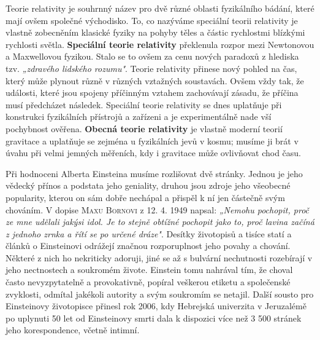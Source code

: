        Teorie relativity je souhrnný název pro dvě různé oblasti fyzikálního bádání, které mají
        ovšem společné východisko. To, co nazýváme speciální teorii relativity je vlastně zobecněním
        klasické fyziky na pohyby těles a částic rychlostmi blízkými rychlosti světla.
        \textbf{Speciální teorie relativity} překlenula rozpor mezi Newtonovou a Maxwellovou
        fyzikou. Stalo se to ovšem za cenu nových paradoxů z hlediska tzv. \emph{„zdravého lidského
        rozumu"}. Teorie relativity přinese nový pohled na čas, který může plynout různě v různých
        vztažných soustavách. Ovšem vždy tak, že události, které jsou spojeny příčinným vztahem
        zachovávají zásadu, že příčina musí předcházet následek. Speciální teorie relativity se dnes
        uplatňuje při konstrukci fyzikálních přístrojů a zařízeni a je experimentálně nade vší
        pochybnost ověřena. \textbf{Obecná teorie relativity} je vlastně moderní teorií gravitace a
        uplatňuje se zejména u fyzikálních jevů v kosmu; musíme ji brát v úvahu při velmi jemných
        měřeních, kdy i gravitace může ovlivňovat chod času.

        Při hodnoceni Alberta Einsteina musíme rozlišovat dvě stránky. Jednou je jeho vědecký přínos
        a podstata jeho geniality, druhou jsou zdroje jeho všeobecné popularity, kterou on sám dobře
        nechápal a přispěl k ní jen částečně svým chováním. V dopise \textsc{Maxu Bornovi} z 12. 4.
        1949 napsal: \emph{„Nemohu pochopit, proč ze mne udělali jakýsi idol. Je to stejně obtížné
        pochopit jako to, proč lavina začíná z jednoho zrnka a řítí se po určené dráze"}. Desítky
        životopisů a tisíce statí a článků o Einsteinovi odrážejí značnou rozporuplnost jeho povahy
        a chování. Některé z nich ho nekriticky adoruji, jiné se až s bulvární nechutnosti
        rozebírají v jeho nectnostech a soukromém živote. Einstein tomu nahrával tím, že choval
        často nevyzpytatelně a provokativně, popíral veškerou etiketu a společenské zvyklosti,
        odmítal jakékoli autority a svým soukromím se netajil. Další sousto pro Einsteinovy
        životopisce přinesl rok 2006, kdy Hebrejská univerzita v Jeruzalémě po uplynuti 50 let od
        Einsteinovy smrti dala k dispozici více než 3 500 stránek jeho korespondence, včetně
        intimní. 

